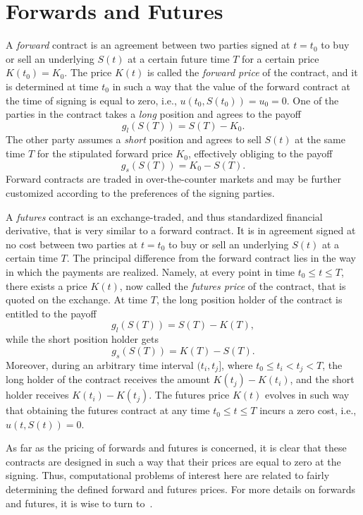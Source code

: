 \documentclass{UUThesisTemplate}
\begin{document}
%
\section{Forwards and Futures}
\label{sec:futures}

\par
A \emph{forward} contract is an agreement between two parties signed at $t=t_0$ to buy or sell an underlying $S(t)$ at a certain future time $T$ for a certain price $K(t_0)=K_0$. The price $K(t)$ is called the \emph{forward price} of the contract, and it is determined at time $t_0$ in such a way that the value of the forward contract at the time of signing is equal to zero, i.e., $u(t_0,S(t_0))=u_0=0$. One of the parties in the contract takes a \emph{long} position and agrees to the payoff 
$$g_l(S(T))=S(T)-K_0.$$
The other party assumes a \emph{short} position and agrees to sell $S(t)$ at the same time $T$ for the stipulated forward price $K_0$, effectively obliging to the payoff 
$$g_s(S(T))=K_0-S(T).$$
Forward contracts are traded in over-the-counter markets and may be further customized according to the preferences of the signing parties.

\par
A \emph{futures} contract is an exchange-traded, and thus standardized financial derivative, that is very similar to a forward contract. It is in agreement signed at no cost between two parties at $t=t_0$ to buy or sell an underlying $S(t)$ at a certain time $T$. The principal difference from the forward contract lies in the way in which the payments are realized. Namely, at every point in time $t_0 \leq t \leq T$, there exists a price $K(t)$, now called the \emph{futures price} of the contract, that is quoted on the exchange. At time $T$, the long position holder of the contract is entitled to the payoff 
$$g_l(S(T))=S(T)-K(T),$$
while the short position holder gets 
$$g_s(S(T))=K(T)-S(T).$$
Moreover, during an arbitrary time interval $(t_i,t_j]$, where $t_0 \leq t_i < t_j < T$, the long holder of the contract receives the amount $K(t_j)-K(t_i)$, and the short holder receives $K(t_i)-K(t_j)$. The futures price $K(t)$ evolves in such way that obtaining the futures contract at any time $t_0 \leq t \leq T$ incurs a zero cost, i.e., $u(t,S(t))=0$. 

\par
As far as the pricing of forwards and futures is concerned, it is clear that these contracts are designed in such a way that their prices are equal to zero at the signing. Thus, computational problems of interest here are related to fairly determining the defined forward and futures prices. For more details on forwards and futures, it is wise to turn to~\cite{duffie1989futures,hull2017options}.  
%
\end{document}
